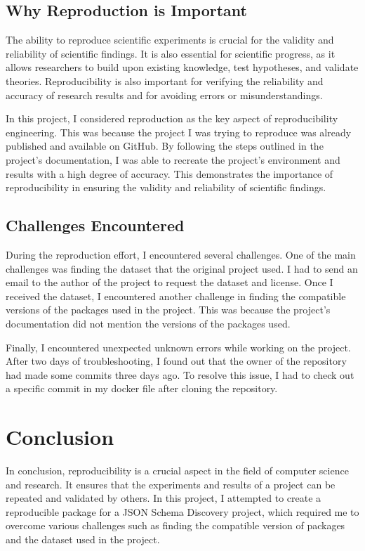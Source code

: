 \documentclass[manuscript,screen,review]{acmart}
\begin{document}
\subsection{Why Reproduction is Important}

The ability to reproduce scientific experiments is crucial for the validity and reliability of scientific findings. It is also essential for scientific progress, as it allows researchers to build upon existing knowledge, test hypotheses, and validate theories. Reproducibility is also important for verifying the reliability and accuracy of research results and for avoiding errors or misunderstandings.

In this project, I considered reproduction as the key aspect of reproducibility engineering. This was because the project I was trying to reproduce was already published and available on GitHub. By following the steps outlined in the project's documentation, I was able to recreate the project's environment and results with a high degree of accuracy. This demonstrates the importance of reproducibility in ensuring the validity and reliability of scientific findings.

\subsection{Challenges Encountered}

During the reproduction effort, I encountered several challenges. One of the main challenges was finding the dataset that the original project used. I had to send an email to the author of the project to request the dataset and license. Once I received the dataset, I encountered another challenge in finding the compatible versions of the packages used in the project. This was because the project's documentation did not mention the versions of the packages used.

Finally, I encountered unexpected unknown errors while working on the project. After two days of troubleshooting, I found out that the owner of the repository had made some commits three days ago. To resolve this issue, I had to check out a specific commit in my docker file after cloning the repository.

\section{Conclusion}
In conclusion, reproducibility is a crucial aspect in the field of computer science and research. It ensures that the experiments and results of a project can be repeated and validated by others. In this project, I attempted to create a reproducible package for a JSON Schema Discovery project, which required me to overcome various challenges such as finding the compatible version of packages and the dataset used in the project.
\end{document}
